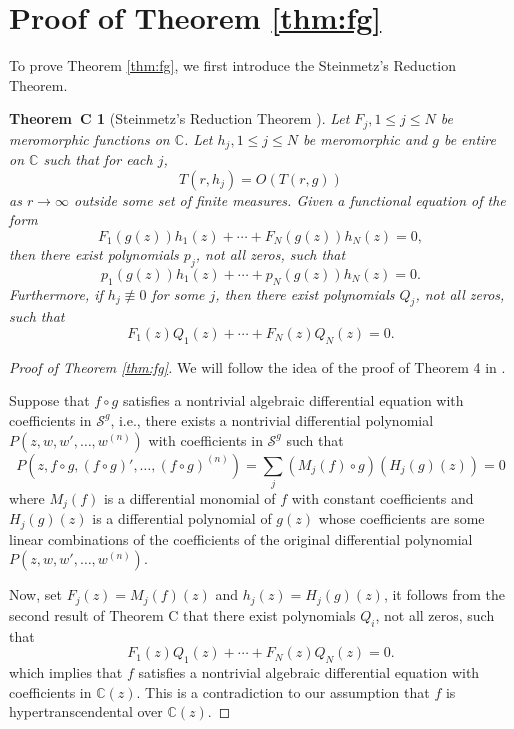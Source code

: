 \documentclass[reqno,12pt]{amsart}
\newtheorem*{thmC}{Theorem~C}
\begin{document}
\section{Proof of Theorem \ref{thm:fg}}\label{sec:fg}
To prove Theorem \ref{thm:fg}, we first introduce the Steinmetz's Reduction Theorem. 

\begin{thmC}[Steinmetz's Reduction Theorem \cite{GO89, Stem80}]\label{thm:Stein}
Let $F_j, 1\leq j\leq N$ be meromorphic functions on $\mathbb{C}$. Let $h_j, 1\leq j\leq N$ be meromorphic and $g$ be entire on $\mathbb{C}$ such that for each $j$, $$T(r, h_j)=O(T(r, g))$$ as $r\rightarrow\infty$ outside some set of finite measures.
 Given a functional equation of the form $$F_1(g(z))h_1(z)+\cdots+F_N(g(z))h_N(z)=0,$$ then there exist polynomials $p_j$, not all zeros, such that $$p_1(g(z))h_1(z)+\cdots+p_N(g(z))h_N(z)=0.$$ Furthermore, if $h_j\not\equiv 0$ for some $j$, then there exist polynomials $Q_j$, not all zeros, such that $$F_1(z)Q_1(z)+\cdots+F_N(z)Q_N(z)=0.$$
\end{thmC}

\begin{proof}[Proof of Theorem \ref{thm:fg}] We will follow the idea of the proof of Theorem 4 in \cite{HY91}.

Suppose that $f\circ g$ satisfies a nontrivial algebraic differential equation with coefficients in $\mathcal{S}^g$, i.e., there exists a nontrivial differential polynomial $P(z, w, w', \dots, w^{(n)})$ with coefficients in $\mathcal{S}^g$ such that
$$P(z, f\circ g, (f\circ g)', \dots, (f\circ g)^{(n)})=\sum_{j}(M_j(f)\circ g)(H_j(g)(z))=0$$ where $M_j(f)$ is a differential monomial of $f$ with constant coefficients and $H_j(g)(z)$ is a differential polynomial of $g(z)$ whose coefficients are some linear combinations of the coefficients of the original differential polynomial $P(z, w, w', \dots, w^{(n)})$. 

Now, set $F_j(z)=M_j(f)(z)$ and $h_j(z)=H_j(g)(z)$, it follows from the second result of Theorem $\mathrm{C}$ that there exist polynomials $Q_i$, not all zeros, such that$$F_1(z)Q_1(z)+\cdots+F_N(z)Q_N(z)=0.$$
which implies that $f$ satisfies a nontrivial algebraic differential equation with coefficients in $\mathbb{C}(z)$. This is a contradiction to our assumption that $f$ is hypertranscendental over $\mathbb{C}(z)$.

\end{proof} 
\end{document}
